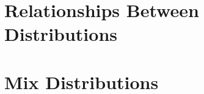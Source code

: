 \clearpage










\chapter{Relationships Between Distributions}









\chapter{Mix Distributions}







